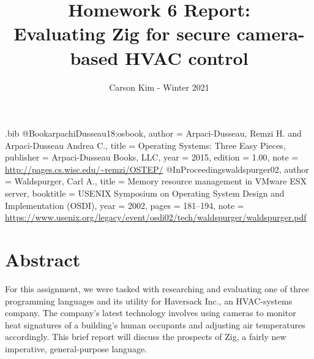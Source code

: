 \usepackage{filecontents}

\begin{filecontents}{\jobname.bib}
@Book{arpachiDusseau18:osbook,
  author =       {Arpaci-Dusseau, Remzi H. and Arpaci-Dusseau Andrea C.},
  title =        {Operating Systems: Three Easy Pieces},
  publisher =    {Arpaci-Dusseau Books, LLC},
  year =         2015,
  edition =      {1.00},
  note =         {\url{http://pages.cs.wisc.edu/~remzi/OSTEP/}}
}
@InProceedings{waldspurger02,
  author =       {Waldspurger, Carl A.},
  title =        {Memory resource management in {VMware ESX} server},
  booktitle =    {USENIX Symposium on Operating System Design and
                  Implementation (OSDI)},
  year =         2002,
  pages =        {181--194},
  note =         {\url{https://www.usenix.org/legacy/event/osdi02/tech/waldspurger/waldspurger.pdf}}}
\end{filecontents}



\date{}

\title{\Large \bf Homework 6 Report:\\
 Evaluating Zig for secure camera-based HVAC control}

\author{Carson Kim - Winter 2021}
\maketitle


\section{Abstract}

For this assignment, we were tasked with researching and evaluating one of three programming languages and its utility for Haversack Inc., an HVAC-systems company. The company's latest technology involves using cameras to monitor heat signatures of a building's human occupants and adjusting air temperatures accordingly. This brief report will discuss the prospects of Zig, a fairly new imperative, general-purpose language. 


